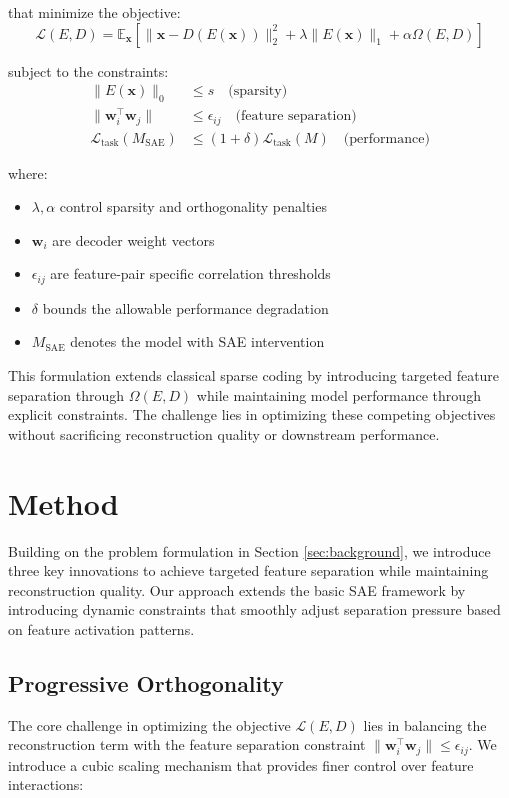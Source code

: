 \documentclass{article} %
\begin{document}
that minimize the objective:
\begin{equation}
    \mathcal{L}(E,D) = \mathbb{E}_{\mathbf{x}}[\|\mathbf{x} - D(E(\mathbf{x}))\|_2^2 + \lambda\|E(\mathbf{x})\|_1 + \alpha\Omega(E,D)]
\end{equation}

subject to the constraints:
\begin{align*}
    \|E(\mathbf{x})\|_0 &\leq s \quad \text{(sparsity)} \\
    \|\mathbf{w}_i^{\top}\mathbf{w}_j\| &\leq \epsilon_{ij} \quad \text{(feature separation)} \\
    \mathcal{L}_{\text{task}}(M_{\text{SAE}}) &\leq (1+\delta)\mathcal{L}_{\text{task}}(M) \quad \text{(performance)}
\end{align*}

where:
\begin{itemize}
    \item $\lambda, \alpha$ control sparsity and orthogonality penalties
    \item $\mathbf{w}_i$ are decoder weight vectors
    \item $\epsilon_{ij}$ are feature-pair specific correlation thresholds
    \item $\delta$ bounds the allowable performance degradation
    \item $M_{\text{SAE}}$ denotes the model with SAE intervention
\end{itemize}

This formulation extends classical sparse coding by introducing targeted feature separation through $\Omega(E,D)$ while maintaining model performance through explicit constraints. The challenge lies in optimizing these competing objectives without sacrificing reconstruction quality or downstream performance.

\section{Method}
\label{sec:method}

Building on the problem formulation in Section \ref{sec:background}, we introduce three key innovations to achieve targeted feature separation while maintaining reconstruction quality. Our approach extends the basic SAE framework by introducing dynamic constraints that smoothly adjust separation pressure based on feature activation patterns.

\subsection{Progressive Orthogonality}
The core challenge in optimizing the objective $\mathcal{L}(E,D)$ lies in balancing the reconstruction term with the feature separation constraint $\|\mathbf{w}_i^{\top}\mathbf{w}_j\| \leq \epsilon_{ij}$. We introduce a cubic scaling mechanism that provides finer control over feature interactions:
\end{document}
